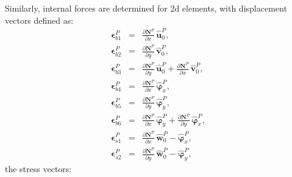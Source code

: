 Similarly, internal forces are determined for \ac{2d} elements, with displacement vectors defined as:
\begin{eqnarray}
	\label{eq:strain_b}
	\boldsymbol{\epsilon}^P_{b1} &=& \frac{\partial \textbf{N}^P}{\partial x}\, \widehat{\textbf{u}}^P_0,\\
	\boldsymbol{\epsilon}^P_{b2} &=& \frac{\partial \textbf{N}^P}{\partial y}\, \widehat{\textbf{v}}^P_0,\\
	\boldsymbol{\epsilon}^P_{b3} &=& \frac{\partial \textbf{N}^P}{\partial y}\, \widehat{\textbf{u}}^P_0 +
	\frac{\partial \textbf{N}^P}{\partial x}\, \widehat{\textbf{v}}^P_0,\\
	\boldsymbol{\epsilon}^P_{b4} &=& \frac{\partial \textbf{N}^P}{\partial x}\, \widehat{\boldsymbol{\varphi}}^P_x,\\
	\boldsymbol{\epsilon}^P_{b5} &=& \frac{\partial \textbf{N}^P}{\partial y}\, \widehat{\boldsymbol{\varphi}}^P_y,\\
	\boldsymbol{\epsilon}^P_{b6} &=& \frac{\partial \textbf{N}^P}{\partial x}\, \widehat{\boldsymbol{\varphi}}^P_y + 
	\frac{\partial \textbf{N}^P}{\partial y}\, \widehat{\boldsymbol{\varphi}}^P_x,\\
	\boldsymbol{\epsilon}^P_{s1} &=& \frac{\partial \textbf{N}^P}{\partial x}\, \widehat{\textbf{w}}^P_0 - \widehat{\boldsymbol{\varphi}}^P_x,\\
	\boldsymbol{\epsilon}^P_{s2} &=& \frac{\partial \textbf{N}^P}{\partial y}\, \widehat{\textbf{w}}^P_0 -\widehat{\boldsymbol{\varphi}}^P_y,
\end{eqnarray}
the stress vectors:
